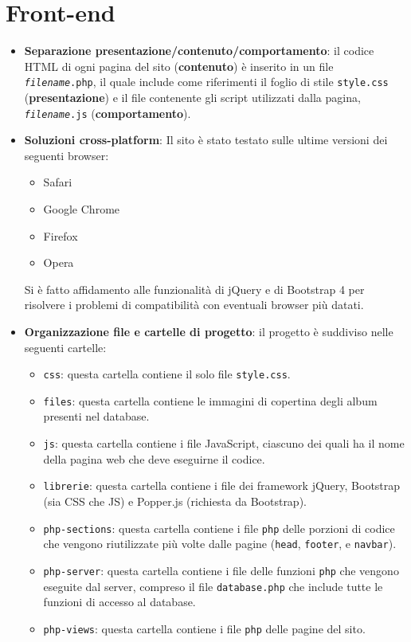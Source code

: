 \section{Front-end}
\begin{itemize}
    \item \textbf{Separazione presentazione/contenuto/comportamento}: il codice HTML di ogni pagina del sito (\textbf{contenuto}) è inserito in un file \texttt{\textit{filename}.php}, il quale include come riferimenti il foglio di stile \texttt{style.css} (\textbf{presentazione}) e il file contenente gli script utilizzati dalla pagina, \texttt{\textit{filename}.js} (\textbf{comportamento}).
    \item \textbf{Soluzioni cross-platform}:
        Il sito è stato testato sulle ultime versioni dei seguenti browser:
            \begin{itemize}
                \item Safari
                \item Google Chrome
                \item Firefox
                \item Opera
            \end{itemize}
        Si è fatto affidamento alle funzionalità di jQuery e di Bootstrap 4 per risolvere i problemi di compatibilità con eventuali browser più datati.
    \item \textbf{Organizzazione file e cartelle di progetto}: il progetto è suddiviso nelle seguenti cartelle:
        \begin{itemize}
            \item \texttt{css}: questa cartella contiene il solo file \texttt{style.css}.
            \item \texttt{files}: questa cartella contiene le immagini di copertina degli album presenti nel database.
            \item \texttt{js}: questa cartella contiene i file JavaScript, ciascuno dei quali ha il nome della pagina web che deve eseguirne il codice.
            \item \texttt{librerie}: questa cartella contiene i file dei framework jQuery, Bootstrap (sia CSS che JS) e Popper.js (richiesta da Bootstrap).
            \item \texttt{php-sections}:  questa cartella contiene i file \texttt{php} delle porzioni di codice che vengono riutilizzate più volte dalle pagine (\texttt{head}, \texttt{footer}, e \texttt{navbar}).
            \item \texttt{php-server}: questa cartella contiene i file delle funzioni \texttt{php} che vengono eseguite dal server, compreso il file \texttt{database.php} che include tutte le funzioni di accesso al database.
            \item \texttt{php-views}: questa cartella contiene i file \texttt{php} delle pagine del sito.
        \end{itemize}
\end{itemize}